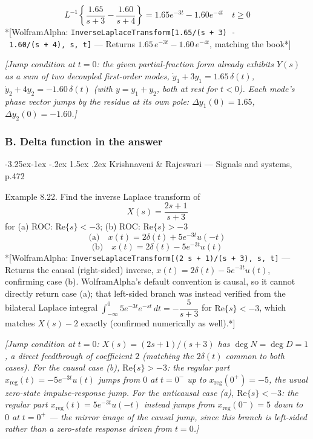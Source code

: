 \documentclass[
  11pt,
]{article}
\makeatletter
\renewcommand\paragraph{\@startsection{paragraph}{4}{\z@}%
                                     {-3.25ex\@plus -1ex \@minus -.2ex}%
                                     {1.5ex \@plus .2ex}%
                                     {\normalfont\normalsize\bfseries}}
\makeatother
\begin{document}
\[L^{-1} \left\{ \frac{1.65}{s+3} - \frac{1.60}{s+4} \right\}
= 1.65e^{-3t} - 1.60e^{-4t} \quad t \geq 0
\] *{[}WolframAlpha:
\texttt{InverseLaplaceTransform{[}1.65/(s\ +\ 3)\ -\ 1.60/(s\ +\ 4),\ s,\ t{]}}
--- Returns \(1.65\,e^{-3t} - 1.60\,e^{-4t}\), matching the book*{]}

\emph{{[}Jump condition at \(t=0\): the given partial-fraction form
already exhibits \(Y(s)\) as a sum of two decoupled first-order modes,
\(\dot y_1+3y_1=1.65\,\delta(t)\), \(\dot y_2+4y_2=-1.60\,\delta(t)\)
(with \(y=y_1+y_2\), both at rest for \(t<0\)). Each mode's phase vector
jumps by the residue at its own pole: \(\Delta y_1(0)=1.65\),
\(\Delta y_2(0)=-1.60\).{]}}

\hypertarget{first-order-b-delta}{%
\subsubsection{B. Delta function in the
answer}\label{first-order-b-delta}}

\hypertarget{krishnaveni-rajeswari-signals-and-systems-p.472}{%
\paragraph{Krishnaveni \& Rajeswari --- Signals and systems,
p.472}\label{krishnaveni-rajeswari-signals-and-systems-p.472}}

Example 8.22. Find the inverse Laplace transform of \[
X(s) = \frac{2s+1}{s+3}
\] for (a) ROC: \(\text{Re}\{s\} < -3\); (b) ROC:
\(\text{Re}\{s\} > -3\) \[
\text{(a)}\quad x(t) = 2\delta(t) + 5e^{-3t}u(-t)
\] \[
\text{(b)}\quad x(t) = 2\delta(t) - 5e^{-3t}u(t)
\] *{[}WolframAlpha:
\texttt{InverseLaplaceTransform{[}(2\ s\ +\ 1)/(s\ +\ 3),\ s,\ t{]}} ---
Returns the causal (right-sided) inverse,
\(x(t) = 2\delta(t) - 5e^{-3t}u(t)\), confirming case (b).
WolframAlpha's default convention is causal, so it cannot directly
return case (a); that left-sided branch was instead verified from the
bilateral Laplace integral
\(\int_{-\infty}^{0} 5e^{-3t}e^{-st}\,dt = -\dfrac{5}{s+3}\) for
\(\text{Re}\{s\}<-3\), which matches \(X(s)-2\) exactly (confirmed
numerically as well).*{]}

\emph{{[}Jump condition at \(t=0\): \(X(s)=(2s+1)/(s+3)\) has
\(\deg N=\deg D=1\), a direct feedthrough of coefficient \(2\) (matching
the \(2\delta(t)\) common to both cases). For the causal case (b),
\(\text{Re}\{s\}>-3\): the regular part
\(x_{\text{reg}}(t)=-5e^{-3t}u(t)\) jumps from \(0\) at \(t=0^-\) up to
\(x_{\text{reg}}(0^+)=-5\), the usual zero-state impulse-response jump.
For the anticausal case (a), \(\text{Re}\{s\}<-3\): the regular part
\(x_{\text{reg}}(t)=5e^{-3t}u(-t)\) instead jumps from
\(x_{\text{reg}}(0^-)=5\) down to \(0\) at \(t=0^+\) --- the mirror
image of the causal jump, since this branch is left-sided rather than a
zero-state response driven from \(t=0\).{]}}
\end{document}
